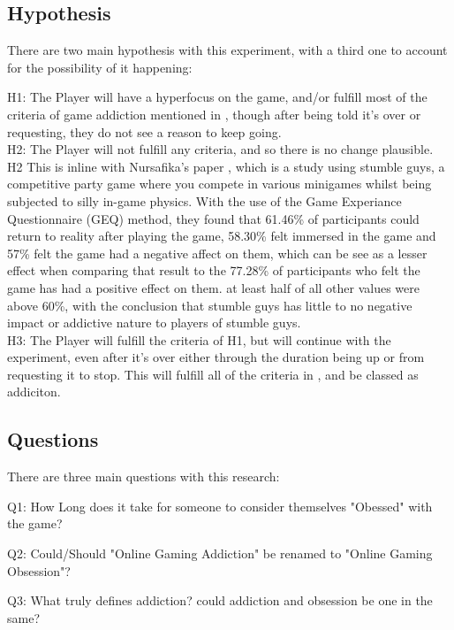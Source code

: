 \documentclass[conference]{IEEEtran}
\begin{document}
\subsection{Hypothesis}
There are two main hypothesis with this experiment, with a third one to account for the possibility of it happening:

H1: The Player will have a hyperfocus on the game, and/or fulfill most of the criteria of game addiction mentioned in \cite{NHSHamp24}, though after being told it's over or requesting, they do not see a reason to keep going.\\

H2: The Player will not fulfill any criteria, and so there is no change plausible.\\

H2 This is inline with Nursafika's paper \cite{Nursafika2024}, which is a study using stumble guys, a competitive party game where you compete in various minigames whilst being subjected to silly in-game physics. With the use of the Game Experiance Questionnaire (GEQ) method, they found that 61.46\% of participants could return to reality after playing the game, 58.30\% felt immersed in the game and 57\% felt the game had a negative affect on them, which can be see as a lesser effect when comparing that result to the 77.28\% of participants who felt the game has had a positive effect on them. at least half of all other values were above 60\%,  with the conclusion that stumble guys has little to no negative impact or addictive nature to players of stumble guys.\\

H3: The Player will fulfill the criteria of H1, but will continue with the experiment, even after it's over either through the duration being up or from requesting it to stop. This will fulfill all of the criteria in \cite{NHSHamp24}, and be classed as addiciton. \\
\subsection{Questions}
There are three main questions with this research:

Q1: How Long does it take for someone to consider themselves "Obessed" with the game?

Q2: Could/Should "Online Gaming Addiction" be renamed to "Online Gaming Obsession"?

Q3: What truly defines addiction? could addiction and obsession be one in the same?\\
\end{document}
